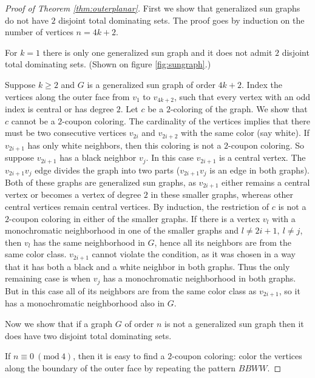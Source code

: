 \begin{proof}[Proof of Theorem \ref{thm:outerplanar}]
  First we show that generalized sun graphs do not have $2$ disjoint total
  dominating sets. The proof goes by induction on the number of vertices $n = 4k + 2$.

  For $k = 1$ there is only one generalized sun graph and it does not admit $2$
  disjoint total dominating sets. (Shown on figure \ref{fig:sungraph}.)

  Suppose $k \ge 2$ and $G$ is a generalized sun graph of order $4k + 2$. Index
  the vertices along the outer face from $v_1$ to $v_{4k + 2}$, such that every
  vertex with an odd index is central or has degree $2$. Let $c$ be a $2$-coloring of
  the graph. We show that $c$ cannot be a $2$-coupon coloring. The cardinality of the
  vertices implies that there must be two consecutive vertices $v_{2i}$ and $v_{2i + 2}$
  with the same color (say white). If $v_{2i + 1}$ has only white neighbors, then this
  coloring is not a $2$-coupon coloring. So suppose $v_{2i + 1}$ has a black neighbor
  $v_j$. In this case $v_{2i + 1}$ is a central vertex. The $v_{2i + 1}v_j$ edge divides the graph
  into two parts ($v_{2i + 1}v_j$ is an edge in both graphs). Both of
  these graphs are generalized sun graphs, as $v_{2i + 1}$ either remains a central
  vertex or becomes a vertex of degree $2$ in these smaller graphs, whereas other
  central vertices remain central vertices. By induction, the restriction of
  $c$ is not a $2$-coupon coloring in either of the smaller graphs. If there is
  a vertex $v_l$ with a monochromatic neighborhood in one of the smaller graphs
  and $l \neq 2i + 1,\ l \neq j$, then $v_l$ has the same neighborhood in $G$, hence
  all its neighbors are from the same color class. $v_{2i + 1}$ cannot violate the
  condition, as it was chosen in a way that it has both a black and a white neighbor
  in both graphs. Thus the only remaining case is when $v_j$ has a monochromatic
  neighborhood in both graphs. But in this case all of its neighbors are from
  the same color class as $v_{2i + 1}$, so it has a monochromatic neighborhood also
  in $G$.

  \vspace{0.4cm}

  Now we show that if a graph $G$ of order $n$ is not a generalized sun graph
  then it does have two disjoint total dominating sets.

  If $n \equiv 0\ (\textrm{mod}\ 4)$, then it is easy to find a $2$-coupon coloring:
  color the vertices along the boundary of the outer face by repeating the pattern
  $BBWW$.


\end{proof}
